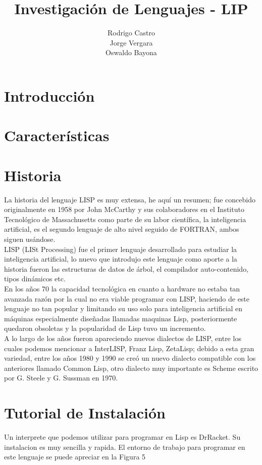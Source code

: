 \documentclass[11pt]{article} %
\title{Investigación de Lenguajes - LIP}
\author{Rodrigo Castro\\Jorge Vergara\\Oswaldo Bayona}
\begin{document}
\maketitle

\section{Introducción}

\section{Características}


\section{Historia}
La historia del lenguaje LISP es muy extensa, he aquí un resumen; fue concebido originalmente en 1958 por  
John McCarthy y sus colaboradores en el Instituto Tecnológico de Massachusetts como parte de su labor científica, 
la inteligencia artificial, es el segundo lenguaje de alto nivel seguido de FORTRAN, ambos siguen usándose. \\

LISP (LISt Processing) fue el primer lenguaje desarrollado para estudiar la inteligencia
artificial, lo nuevo que introdujo este lenguaje como aporte a la historia fueron las estructuras
de datos de árbol, el compilador auto-contenido, tipos dinámicos etc.\\

En los años 70 la capacidad tecnológica en cuanto a hardware no estaba tan avanzada razón
por la cual no era viable programar con LISP, haciendo de este lenguaje no tan popular y 
limitando su uso solo para inteligencia artificial en máquinas especialmente diseñadas
llamadas maquinas Lisp, posteriormente quedaron obsoletas y la popularidad de Lisp tuvo
un incremento. \\

A lo largo de los años fueron apareciendo nuevos dialectos de LISP, entre los cuales podemos
mencionar a InterLISP, Franz Lisp,  ZetaLisp; debido a esta gran variedad, entre los años 1980 y 
1990 se creó un nuevo dialecto compatible con los anteriores llamado Common Lisp, otro 
dialecto muy importante es Scheme escrito por G. Steele y G. Sussman  en 1970.\\



\section{Tutorial de Instalación}
Un interprete que podemos utilizar para programar en Lisp es DrRacket. Su instalacion es muy sencilla y rapida.
El entorno de trabajo para programar en este lenguaje se puede apreciar en la Figura 5
\end{document}
